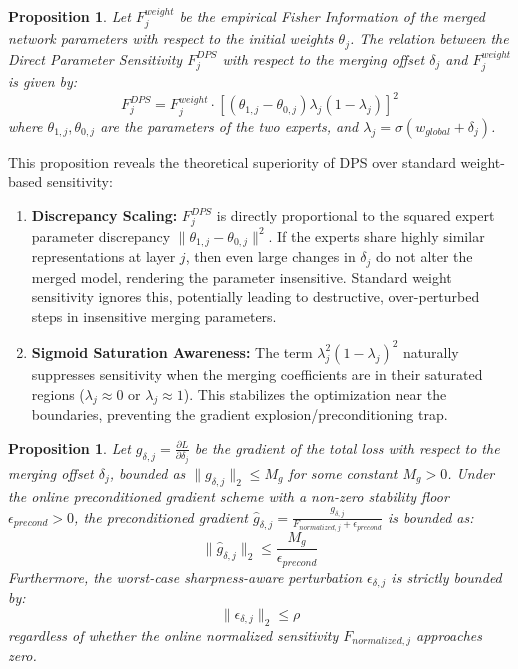 \documentclass{article}
\theoremstyle{plain}
\newtheorem{proposition}[theorem]{Proposition}
\theoremstyle{definition}
\theoremstyle{remark}
\begin{document}
\begin{proposition}
\label{prop:chain_rule}
Let $F^{weight}_j$ be the empirical Fisher Information of the merged network parameters with respect to the initial weights $\theta_j$. The relation between the Direct Parameter Sensitivity $F^{DPS}_j$ with respect to the merging offset $\delta_j$ and $F^{weight}_j$ is given by:
\begin{equation}
  F^{DPS}_j = F^{weight}_j \cdot \left[ (\theta_{1, j} - \theta_{0, j}) \lambda_j (1 - \lambda_j) \right]^2
\end{equation}
where $\theta_{1, j}, \theta_{0, j}$ are the parameters of the two experts, and $\lambda_j = \sigma(w_{global} + \delta_j)$.
\end{proposition}

This proposition reveals the theoretical superiority of DPS over standard weight-based sensitivity:
\begin{enumerate}
  \item \textbf{Discrepancy Scaling:} $F^{DPS}_j$ is directly proportional to the squared expert parameter discrepancy $\|\theta_{1, j} - \theta_{0, j}\|^2$. If the experts share highly similar representations at layer $j$, then even large changes in $\delta_j$ do not alter the merged model, rendering the parameter insensitive. Standard weight sensitivity ignores this, potentially leading to destructive, over-perturbed steps in insensitive merging parameters.
  \item \textbf{Sigmoid Saturation Awareness:} The term $\lambda_j^2 (1 - \lambda_j)^2$ naturally suppresses sensitivity when the merging coefficients are in their saturated regions ($\lambda_j \approx 0$ or $\lambda_j \approx 1$). This stabilizes the optimization near the boundaries, preventing the gradient explosion/preconditioning trap.
\end{enumerate}

\begin{proposition}
\label{prop:stability_bound}
Let $g_{\delta, j} = \frac{\partial L}{\partial \delta_j}$ be the gradient of the total loss with respect to the merging offset $\delta_j$, bounded as $\|g_{\delta, j}\|_2 \leq M_g$ for some constant $M_g > 0$. Under the online preconditioned gradient scheme with a non-zero stability floor $\epsilon_{precond} > 0$, the preconditioned gradient $\hat{g}_{\delta, j} = \frac{g_{\delta, j}}{F_{normalized, j} + \epsilon_{precond}}$ is bounded as:
\begin{equation}
  \|\hat{g}_{\delta, j}\|_2 \leq \frac{M_g}{\epsilon_{precond}}
\end{equation}
Furthermore, the worst-case sharpness-aware perturbation $\epsilon_{\delta, j}$ is strictly bounded by:
\begin{equation}
  \|\epsilon_{\delta, j}\|_2 \leq \rho
\end{equation}
regardless of whether the online normalized sensitivity $F_{normalized, j}$ approaches zero.
\end{proposition}
\end{document}
